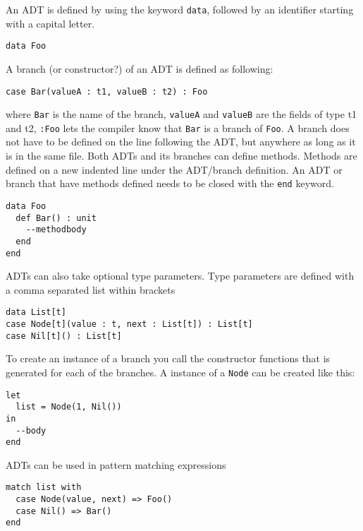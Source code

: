 \documentclass[10pt]{report}
\begin{document}
\par{\noindent An ADT is defined by using the keyword \texttt{data}, followed by an identifier starting with a capital letter.}
\begin{lstlisting}[language=Encore]
data Foo
\end{lstlisting}
A branch (or constructor?) of an ADT is defined as following:
\begin{lstlisting}[language=Encore]
case Bar(valueA : t1, valueB : t2) : Foo
\end{lstlisting}
where \texttt{Bar} is the name of the branch, \texttt{valueA} and \texttt{valueB} are the fields of type t1 and t2, \texttt{:Foo} lets the compiler know that \texttt{Bar} is a branch of \texttt{Foo}.
A branch does not have to be defined on the line following the ADT, but anywhere as long as it is in the same file.
Both ADTs and its branches can define methods. Methods are defined on a new indented line under the ADT/branch definition.
An ADT or branch that have methods defined needs to be closed with the \texttt{end} keyword.
\begin{lstlisting}[language=encore,caption={ADT definition with a method}]
data Foo
  def Bar() : unit
    --methodbody
  end
end
\end{lstlisting}
ADTs can also take optional type parameters. Type parameters are defined with a comma separated list within brackets
\begin{lstlisting}[language=encore,caption={Generic linked list implemented with an ADT}]
data List[t]
case Node[t](value : t, next : List[t]) : List[t]
case Nil[t]() : List[t]
\end{lstlisting}
To create an instance of a branch you call the constructor functions that is generated for each of the branches.
A instance of a \texttt{Node} can be created like this:
\begin{lstlisting}[language=encore,caption={Declaration of a list containing one element}]
let
  list = Node(1, Nil())
in
  --body
end
\end{lstlisting}
ADTs can be used in pattern matching expressions
\begin{lstlisting}[language=encore,caption={Pattern matching on a linked list}]
match list with
  case Node(value, next) => Foo()
  case Nil() => Bar()
end
\end{lstlisting}
\end{document}

